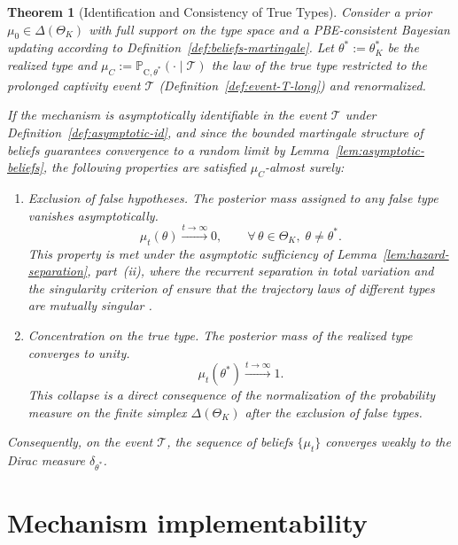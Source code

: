 \documentclass[review,authoryear,12pt]{elsarticle}
\theoremstyle{plain}
\newtheorem{theorem}{Theorem}
\theoremstyle{definition}
\newcommand{\ProbC}[1]{\mathbb{P}_{\mathrm{C},#1}}
\newcommand{\ThetaK}{\Theta_K}
\newcommand{\1}{\mathbf{1}}
\begin{document}
\begin{theorem}[Identification and Consistency of True Types]\label{thm:posterior-consistency}
\normalfont
Consider a prior $\mu_0\in\Delta(\ThetaK)$ with full support on the type space and a PBE-consistent Bayesian updating according to Definition~\ref{def:beliefs-martingale}. Let $\theta^\ast:=\theta_K^\ast$ be the realized type and $\mu_C:=\ProbC{\theta^\ast}(\cdot\mid\mathcal{T})$ the law of the true type restricted to the prolonged captivity event $\mathcal{T}$ \textup{(}Definition~\ref{def:event-T-long}\textup{)} and renormalized.

If the mechanism is asymptotically identifiable in the event $\mathcal{T}$ under Definition~\ref{def:asymptotic-id}, and since the bounded martingale structure of beliefs guarantees convergence to a random limit by Lemma~\ref{lem:asymptotic-beliefs}, the following properties are satisfied $\mu_C$-almost surely:
\begin{enumerate}
  \item Exclusion of false hypotheses. The posterior mass assigned to any false type vanishes asymptotically.
  \begin{equation*}
  \mu_t(\theta)\xrightarrow{t\to\infty}0,\qquad \forall\,\theta\in\ThetaK,\;\theta\neq\theta^\ast.
  \end{equation*}
  This property is met under the asymptotic sufficiency of Lemma~\ref{lem:hazard-separation}, part~\textup{(ii)}, where the recurrent separation in total variation and the singularity criterion of \citet{Kakutani1948} ensure that the trajectory laws of different types are mutually singular \citet{Shiryaev2019Probability}.

  \item Concentration on the true type. The posterior mass of the realized type converges to unity.
  \begin{equation*}
  \mu_t(\theta^\ast)\xrightarrow{t\to\infty}1.
  \end{equation*}
  This collapse is a direct consequence of the normalization of the probability measure on the finite simplex $\Delta(\ThetaK)$ after the exclusion of false types.
\end{enumerate}
Consequently, on the event $\mathcal{T}$, the sequence of beliefs $\{\mu_t\}$ converges weakly to the Dirac measure $\delta_{\theta^\ast}$.
\end{theorem}



\section{Mechanism implementability}\label{sec:implementabilidad}
\end{document}
